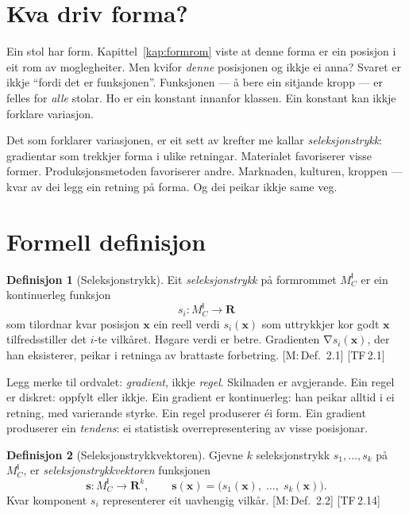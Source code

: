 \documentclass[10pt]{book}
\theoremstyle{definition}
\newtheorem{definisjon}{Definisjon}[chapter]
\theoremstyle{plain}
\theoremstyle{remark}
\newcommand{\MC}{M^{\mathsf{I}}_C}
\providecommand{\R}{}
\renewcommand{\R}{\mathbf{R}}
\DeclareMathOperator{\grad}{\nabla}
\newcommand{\TF}[1]{\textnormal{[TF\,#1]}}
\newcommand{\Mref}[1]{\textnormal{[M:\,#1]}}
\begin{document}
\section{Kva driv forma?}\label{sec:seleksjon:intuisjon}

Ein stol har form. Kapittel~\ref{kap:formrom} viste at denne forma er ein posisjon i eit rom av moglegheiter. Men kvifor \emph{denne} posisjonen og ikkje ei anna? Svaret er ikkje ``fordi det er funksjonen''. Funksjonen --- \aa{} bere ein sitjande kropp --- er felles for \emph{alle} stolar. Ho er ein konstant innanfor klassen. Ein konstant kan ikkje forklare variasjon.

Det som forklarer variasjonen, er eit sett av krefter me kallar \emph{seleksjonstrykk}: gradientar som trekkjer forma i ulike retningar. Materialet favoriserer visse former. Produksjonsmetoden favoriserer andre. Marknaden, kulturen, kroppen --- kvar av dei legg ein retning p\aa{} forma. Og dei peikar ikkje same veg.

\section{Formell definisjon}\label{sec:seleksjon:def}

\begin{definisjon}[Seleksjonstrykk]\label{def:seleksjon}
Eit \emph{seleksjonstrykk} p\aa{} formrommet $\MC$ er ein kontinuerleg funksjon
\[
  s_i : \MC \longrightarrow \R
\]
som tilordnar kvar posisjon $\bm{x}$ ein reell verdi $s_i(\bm{x})$ som uttrykkjer kor godt $\bm{x}$ tilfredsstiller det $i$-te vilk\aa ret. H\o gare verdi er betre. Gradienten $\grad s_i(\bm{x})$, der han eksisterer, peikar i retninga av brattaste forbetring. \Mref{Def.~2.1} \TF{2.1}
\end{definisjon}

Legg merke til ordvalet: \emph{gradient}, ikkje \emph{regel}. Skilnaden er avgjerande. Ein regel er diskret: oppfylt eller ikkje. Ein gradient er kontinuerleg: han peikar alltid i ei retning, med varierande styrke. Ein regel produserer \'ei form. Ein gradient produserer ein \emph{tendens}: ei statistisk overrepresentering av visse posisjonar.

\begin{definisjon}[Seleksjonstrykkvektoren]\label{def:selvektor}
Gjevne $k$ seleksjonstrykk $s_1, \ldots, s_k$ p\aa{} $\MC$, er \emph{seleksjonstrykk\-vektoren} funksjonen
\[
  \bm{s} : \MC \longrightarrow \R^k, \qquad
  \bm{s}(\bm{x}) = \bigl(s_1(\bm{x}),\; \ldots,\; s_k(\bm{x})\bigr).
\]
Kvar komponent $s_i$ representerer eit uavhengig vilk\aa r. \Mref{Def.~2.2} \TF{2.14}
\end{definisjon}
\end{document}
